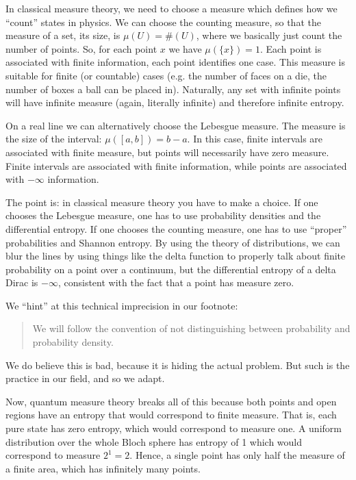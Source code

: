 \documentclass[11pt]{article}
\begin{document}
In classical measure theory, we need to choose a measure which defines how we ``count'' states in physics. We can choose the counting measure, so that the measure of a set, its size, is $\mu(U) = \#(U)$, where we basically just count the number of points. So, for each point $x$ we have $\mu(\{x\}) = 1$. Each point is associated with finite information, each point identifies one case. This measure is suitable for finite (or countable) cases (e.g. the number of faces on a die, the number of boxes a ball can be placed in). Naturally, any set with infinite points will have infinite measure (again, literally infinite) and therefore infinite entropy.

On a real line we can alternatively choose the Lebesgue measure. The measure is the size of the interval: $\mu([a, b]) = b-a$. In this case, finite intervals are associated with finite measure, but points will necessarily have zero measure. Finite intervals are associated with finite information, while points are associated with $-\infty$ information.

The point is: in classical measure theory you have to make a choice. If one chooses the Lebesgue measure, one has to use probability densities and the differential entropy. If one chooses the counting measure, one has to use ``proper'' probabilities and Shannon entropy. By using the theory of distributions, we can blur the lines by using things like the delta function to properly talk about finite probability on a point over a continuum, but the differential entropy of a delta Dirac is $-\infty$, consistent with the fact that a point has measure zero.

We ``hint'' at this technical imprecision in our footnote:
\begin{quote}
	We will follow the convention of not distinguishing between probability and probability density.
\end{quote}
We do believe this is bad, because it is hiding the actual problem. But such is the practice in our field, and so we adapt.

Now, quantum measure theory breaks all of this because both points and open regions have an entropy that would correspond to finite measure. That is, each pure state has zero entropy, which would correspond to measure one. A uniform distribution over the whole Bloch sphere has entropy of 1 which would correspond to measure $2^1 = 2$. Hence, a single point has only half the measure of a finite area, which has infinitely many points.
\end{document}
